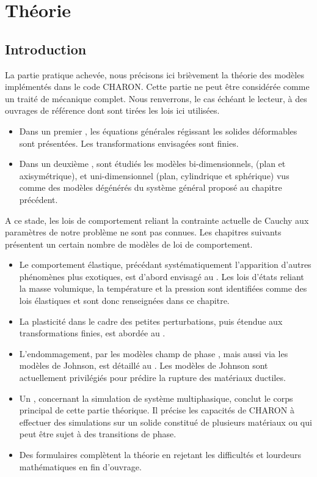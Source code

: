 \documentclass[10pt]{book}
\begin{document}
\newcommand{\TU}{\TenUnit}
\part{Théorie}\label{Part:Theorie}
\chapter*{Introduction}
La partie pratique achevée, nous précisons ici brièvement la théorie des modèles implémentés dans le code CHARON. Cette partie ne peut être considérée comme un traité de mécanique complet. Nous renverrons, le cas échéant le lecteur, à des ouvrages de référence dont sont tirées les lois ici utilisées.
\begin{itemize}[label=$\star$]
\item Dans un premier , les équations générales régissant les solides déformables sont présentées. Les transformations envisagées sont finies. 
\item Dans un deuxième , sont étudiés les modèles bi-dimensionnels, (plan et axisymétrique), et uni-dimensionnel (plan, cylindrique et sphérique) vus comme des modèles dégénérés du système général proposé au chapitre précédent.
\end{itemize}
A ce stade, les lois de comportement reliant la contrainte actuelle de Cauchy aux paramètres de notre problème ne sont pas connues. Les chapitres suivants présentent un certain nombre de modèles de loi de comportement.
\begin{itemize}[label=$\star$]
\item Le comportement élastique, précédant systématiquement l'apparition d'autres phénomènes plus exotiques, est d'abord envisagé au . Les lois d'états reliant la masse volumique, la température et la pression sont identifiées comme des lois élastiques et sont donc renseignées dans ce chapitre.
\item La plasticité dans le cadre des petites perturbations, puis étendue aux transformations finies, est abordée au .
\item L'endommagement, par les modèles \og champ de phase \fg{}, mais aussi via les modèles de Johnson, est détaillé au . Les modèles de Johnson sont actuellement privilégiés pour prédire la rupture des matériaux ductiles.
\item Un , concernant la simulation de système multiphasique, conclut le corps principal de cette partie théorique. Il précise les capacités de CHARON à effectuer des simulations sur un solide constitué de plusieurs matériaux ou qui peut être sujet à des transitions de phase.
\item Des formulaires  complètent la théorie en rejetant les difficultés et lourdeurs mathématiques en fin d'ouvrage.
\end{itemize}
\end{document}
